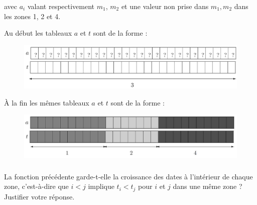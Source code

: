 \documentclass[10pt,fleqn]{article} %
\begin{document}
avec $a_i$ valant respectivement $m_1$, $m_2$ et une valeur non prise dans {$m_1, m_2$} dans les zones 1, 2 et 4.

Au début les tableaux $a$ et $t$ sont de la forme :




\begin{figure}[h]
\begin{center}
\includegraphics[scale=0.21]{images/Image2.jpg} 
\end{center}
\end{figure}

À la fin les mêmes tableaux $a$ et $t$ sont de la forme :



\begin{figure}[h]
\begin{center}
\includegraphics[scale=0.21]{images/Image3.jpg} 
\end{center}
\end{figure}

\subparagraph{} La fonction précédente garde-t-elle la croissance des dates à l’intérieur de chaque zone, c’est-à-dire que $i < j$ implique $t_i < t_j$ pour $i$ et $j$ dans une même zone ? Justifier votre réponse.
\end{document}
